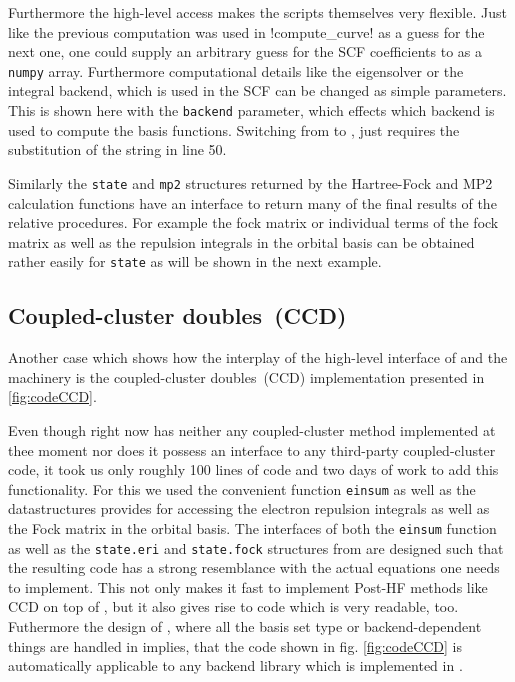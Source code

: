 Furthermore the high-level access makes the scripts themselves very flexible.
Just like the previous computation was used in \code!compute_curve!
as a guess for the next one,
one could supply an arbitrary guess for the SCF coefficients to \molsturm as
a \texttt{numpy} array.
Furthermore computational details like the eigensolver or the integral backend,
which is used in the SCF can be changed as simple parameters.
This is shown here with the \texttt{backend} parameter,
which effects which backend is used to compute the basis functions.
Switching from \libint to \libcint, just requires the substitution of the
string in line 50.

Similarly the \texttt{state} and \texttt{mp2} structures returned by the
Hartree-Fock and MP2 calculation functions have an interface to return
many of the final results of the relative procedures.
For example the  fock matrix or individual terms of the fock matrix as well as
the repulsion integrals in the orbital basis can be obtained rather easily
for \texttt{state} as will be shown in the next example.


\subsection{Coupled-cluster doubles~(CCD)}
\label{sec:ex:ccd}


Another case which shows how the interplay of the high-level interface
of \molsturm and the \numpy machinery is the coupled-cluster doubles~(CCD)
implementation presented in \ref{fig:codeCCD}.

Even though \molsturm right now has neither any coupled-cluster
method implemented at thee moment nor does it possess an interface to any third-party
coupled-cluster code,
it took us only roughly 100 lines of code and two days of work
to add this functionality.
For this we used the convenient \numpy function \texttt{einsum} as well
as the datastructures \molsturm provides for accessing the
electron repulsion integrals as well as the Fock matrix in the orbital basis.
The interfaces of both the \texttt{einsum} function as well as the
\texttt{state.eri} and \texttt{state.fock} structures from \molsturm
are designed such that the resulting code has a strong resemblance
with the actual equations one needs to implement.
This not only makes it fast to implement Post-HF methods like CCD
on top of \molsturm,
but it also gives rise to code which is very readable, too.
Futhermore the design of \molsturm, where all the basis set type
or backend-dependent things are handled in \gint implies,
that the code shown in fig. \ref{fig:codeCCD}
is automatically applicable to any backend library which is implemented in \gint.

